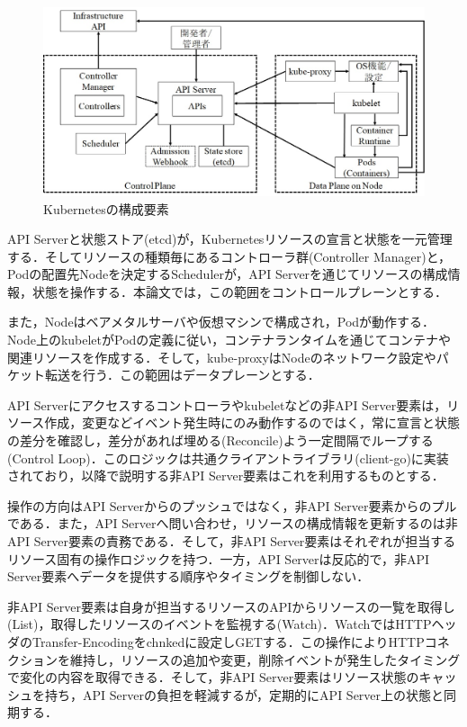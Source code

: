 \documentclass[12pt,a4j]{ujreport}
\begin{document}
\begin{figure}[tb]
  \centerline{\includegraphics[clip,width=140mm]{images/k8s-overall.jpg}}
  \caption{Kubernetesの構成要素}\label{fig3}
\end{figure}

API Serverと状態ストア(etcd)が，Kubernetesリソースの宣言と状態を一元管理する．そしてリソースの種類毎にあるコントローラ群(Controller Manager)と，Podの配置先Nodeを決定するSchedulerが，API Serverを通じてリソースの構成情報，状態を操作する．本論文では，この範囲をコントロールプレーンとする．

また，Nodeはベアメタルサーバや仮想マシンで構成され，Podが動作する．Node上のkubeletがPodの定義に従い，コンテナランタイムを通じてコンテナや関連リソースを作成する．そして，kube-proxyはNodeのネットワーク設定やパケット転送を行う．この範囲はデータプレーンとする．

API Serverにアクセスするコントローラやkubeletなどの非API Server要素は，リソース作成，変更などイベント発生時にのみ動作するのではく，常に宣言と状態の差分を確認し，差分があれば埋める(Reconcile)よう一定間隔でループする(Control Loop)．このロジックは共通クライアントライブラリ(client-go)に実装されており，以降で説明する非API Server要素はこれを利用するものとする．

操作の方向はAPI Serverからのプッシュではなく，非API Server要素からのプルである．また，API Serverへ問い合わせ，リソースの構成情報を更新するのは非API Server要素の責務である．そして，非API Server要素はそれぞれが担当するリソース固有の操作ロジックを持つ．一方，API Serverは反応的で，非API Server要素へデータを提供する順序やタイミングを制御しない．

非API Server要素は自身が担当するリソースのAPIからリソースの一覧を取得し(List)，取得したリソースのイベントを監視する(Watch)．WatchではHTTPヘッダのTransfer-Encodingをchnkedに設定しGETする．この操作によりHTTPコネクションを維持し，リソースの追加や変更，削除イベントが発生したタイミングで変化の内容を取得できる．そして，非API Server要素はリソース状態のキャッシュを持ち，API Serverの負担を軽減するが，定期的にAPI Server上の状態と同期する．
\end{document}
